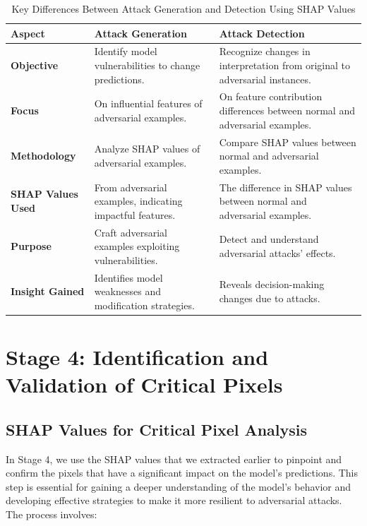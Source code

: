 \documentclass[10pt, conference, a4paper, final]{IEEEtran}
\begin{document}
\begin{table}[h]
    \centering
    \begin{tabular}{|p{1.5cm}|p{2.5cm}|p{2.5cm}|}
    \hline
    \textbf{Aspect} & \textbf{Attack Generation} & \textbf{Attack Detection} \\ \hline
    \textbf{Objective} & Identify model vulnerabilities to change predictions. & Recognize changes in interpretation from original to adversarial instances. \\ \hline
    \textbf{Focus} & On influential features of adversarial examples. & On feature contribution differences between normal and adversarial examples. \\ \hline
    \textbf{Methodology} & Analyze SHAP values of adversarial examples. & Compare SHAP values between normal and adversarial examples. \\ \hline
    \textbf{SHAP Values Used} & From adversarial examples, indicating impactful features. & The difference in SHAP values between normal and adversarial examples. \\ \hline
    \textbf{Purpose} & Craft adversarial examples exploiting vulnerabilities. & Detect and understand adversarial attacks' effects. \\ \hline
    \textbf{Insight Gained} & Identifies model weaknesses and modification strategies. & Reveals decision-making changes due to attacks. \\ \hline
   
\end{tabular}
    \caption{Key Differences Between Attack Generation and Detection Using SHAP Values}
    \label{table:attack-gen-det}
    \end{table}
    
    \section{Stage 4: Identification and Validation of Critical Pixels}

    \subsection{SHAP Values for Critical Pixel Analysis}
    In Stage 4, we use the SHAP values that we extracted earlier to pinpoint and confirm the pixels that have a significant impact on the model's predictions. This step is essential for gaining a deeper understanding of the model's behavior and developing effective strategies to make it more resilient to adversarial attacks.
    The process involves:
\end{document}
